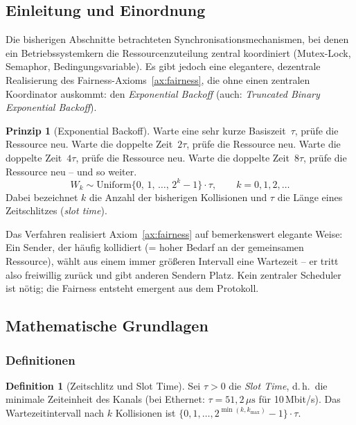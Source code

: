 ﻿\documentclass[a4paper,12pt]{article}
\theoremstyle{definition}
\newtheorem{definition}{Definition}
\newtheorem{prinzip}{Prinzip}
\begin{document}
\subsection{Einleitung und Einordnung}

Die bisherigen Abschnitte betrachteten Synchronisationsmechanismen, bei
denen ein Betriebssystemkern die Ressourcenzuteilung zentral koordiniert
(Mutex-Lock, Semaphor, Bedingungsvariable). Es gibt jedoch eine
elegantere, dezentrale Realisierung des Fairness-Axioms~\ref{ax:fairness},
die ohne einen zentralen Koordinator auskommt: den
\emph{Exponential Backoff} (auch: \emph{Truncated Binary Exponential
Backoff}).

\begin{prinzip}[Exponential Backoff]
\label{prinzip:backoff}
Warte eine sehr kurze Basiszeit~$\tau$, prüfe die Ressource neu.
Warte die doppelte Zeit~$2\tau$, prüfe die Ressource neu.
Warte die doppelte Zeit~$4\tau$, prüfe die Ressource neu.
Warte die doppelte Zeit~$8\tau$, prüfe die Ressource neu -- und so weiter.
\[
  W_k \sim \mathrm{Uniform}\bigl\{0,\, 1,\, \ldots,\, 2^k - 1\bigr\} \cdot \tau,
  \qquad k = 0, 1, 2, \ldots
\]
Dabei bezeichnet $k$ die Anzahl der bisherigen Kollisionen und $\tau$ die
Länge eines Zeitschlitzes (\emph{slot time}).
\end{prinzip}

Das Verfahren realisiert Axiom~\ref{ax:fairness} auf bemerkenswert
elegante Weise: Ein Sender, der häufig kollidiert (= hoher Bedarf an
der gemeinsamen Ressource), wählt aus einem immer größeren Intervall
eine Wartezeit -- er tritt also freiwillig zurück und gibt anderen
Sendern Platz. Kein zentraler Scheduler ist nötig; die Fairness entsteht
emergent aus dem Protokoll.

\subsection{Mathematische Grundlagen}

\subsubsection{Definitionen}

\begin{definition}[Zeitschlitz und Slot Time]
Sei $\tau > 0$ die \emph{Slot Time}, d.\,h.\ die minimale Zeiteinheit
des Kanals (bei Ethernet: $\tau = 51{,}2\,\mu\mathrm{s}$ für
10\,Mbit/s). Das Wartezeitintervall nach $k$ Kollisionen ist
$\{0, 1, \ldots, 2^{\min(k, k_{\max})} - 1\} \cdot \tau$.
\end{definition}
\end{document}
